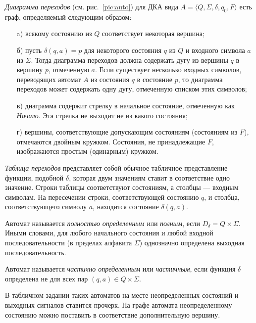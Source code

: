 \textit{Диаграмма переходов} (см. рис.~\ref{pic:auto}) для ДКА вида $A = \langle Q, \Sigma, \delta, q_0, F  \rangle$ есть граф, определяемый следующим образом:
\begin{itemize}
 \item [a)] всякому состоянию из $Q$ соответствует некоторая вершина;
 \item [б)] пусть $\delta(q, a) = p$ для некоторого состояния $q$ из $Q$ и входного символа $a$ из $\Sigma$.
 Тогда диаграмма переходов должна содержать дугу из вершины $q$ в вершину $p$, отмеченную $a$.
 Если существует несколько входных символов, переводящих автомат $A$ из состояния $q$ в состояние $p$, то диаграмма переходов может содержать одну дугу, отмеченную списком этих символов;
 \item [в)] диаграмма содержит стрелку в начальное состояние, отмеченную как \textit{Начало}.
 Эта стрелка не выходит не из какого состояния;
 \item [г)] вершины, соответствующие допускающим состояниям (состояниям из $F$), отмечаются двойным кружком.
 Состояния, не принадлежащие $F$, изображаются простым (одинарным) кружком.
\end{itemize}


\textit{Таблица переходов} представляет собой обычное табличное представление функции, подобной $\delta$, которая двум значениям ставит в соответствие одно значение.
Строки таблицы соответствуют состояниям, а столбцы --- входным символам.
На пересечении строки, соответствующей состоянию $q$, и столбца, соответствующего символу $a$, находится состояние $\delta(q, a)$. 
\cite{Intro-TA}

\begin{Def}
Автомат называется \textit{полностью определенным} или \textit{полным}, если $D_\delta = Q \times \Sigma$.
Иными словами, для любого начального состояния и любой входной последовательности (в пределах алфавита $\Sigma$) однозначно определена выходная последовательность.
\end{Def}

\begin{Def}
Автомат называется \textit{частично определенным} или \textit{частичным}, если функция $\delta$ определена не для всех пар $(q, a) \in Q \times \Sigma$. 
\end{Def}

В табличном задании таких автоматов на месте неопределенных состояний и выходных сигналов ставится прочерк. 
На графе автомата неопределенному состоянию можно поставить в соответствие дополнительную вершину.

